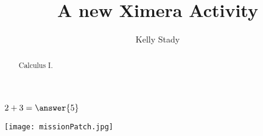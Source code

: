\documentclass{ximera}
\title{A new Ximera Activity}
\author{Kelly Stady}
\begin{document}
\begin{abstract}
    Calculus I.
\end{abstract}
\maketitle


\begin{exercise}
    $2+3=\answer{5}$
\end{exercise}

\begin{center} %
\texttt{[image: missionPatch.jpg]}
\end{center}
\end{document}
